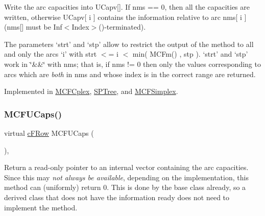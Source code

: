 Write the arc capacities into U\+Capv\mbox{[}\mbox{]}. If nms == 0, then all the capacities are written, otherwise U\+Capv\mbox{[} i \mbox{]} contains the information relative to arc nms\mbox{[} i \mbox{]} (nms\mbox{[}\mbox{]} must be Inf$<$\+Index$>$()-\/terminated).

The parameters `strt' and `stp' allow to restrict the output of the method to all and only the arcs `i' with strt $<$= i $<$ min( M\+C\+Fm() , stp ). `strt' and `stp' work in \char`\"{}\&\&\char`\"{} with nms; that is, if nms != 0 then only the values corresponding to arcs which are {\itshape both} in nms and whose index is in the correct range are returned. 

Implemented in \mbox{\hyperlink{class_m_c_f_cplex_aa5d64c820aa5952a8cd80d4a89eb334a}{M\+C\+F\+Cplex}}, \mbox{\hyperlink{class_s_p_tree_a742113904705a8a2be411ff4939226ae}{S\+P\+Tree}}, and \mbox{\hyperlink{class_m_c_f_simplex_aa5d64c820aa5952a8cd80d4a89eb334a}{M\+C\+F\+Simplex}}.

\mbox{\label{class_m_c_f_class_aae54f2f08242d5fd631eb613d82e4d1c}} 
\subsubsection{\texorpdfstring{M\+C\+F\+U\+Caps()}{MCFUCaps()}\hspace{0.1cm}{\footnotesize\ttfamily [2/2]}}
{\footnotesize\ttfamily virtual \mbox{\hyperlink{class_m_c_f_class_ad325f3193dbba0ddef1da4e72d29eda6}{c\+F\+Row}} M\+C\+F\+U\+Caps (\begin{DoxyParamCaption}\item[{void}]{ }\end{DoxyParamCaption})\hspace{0.3cm}{\ttfamily [inline]}, {\ttfamily [virtual]}}

Return a read-\/only pointer to an internal vector containing the arc capacities. Since this may {\itshape not always be available}, depending on the implementation, this method can (uniformly) return 0. This is done by the base class already, so a derived class that does not have the information ready does not need to implement the method. \mbox{\label{class_m_c_f_class_ab902a23d1c9520a22b79de5d451c3348}} 
